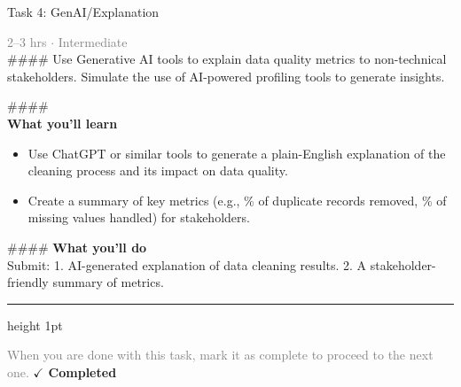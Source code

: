 \documentclass[10pt,a4paper]{article}
\begin{document}
\begin{taskbox}{Task 4: GenAI/Explanation}

    {\small \textcolor{gray}{2--3 hrs $\cdot$ Intermediate}}\\[12pt]

    \#\#\#\#   
Use Generative AI tools to explain data quality metrics to non-technical stakeholders. Simulate the use of AI-powered profiling tools to generate insights.

\#\#\#\# \\[10pt]
\vspace{8pt}
{\large \textbf{\textcolor{brandLight}{What you'll learn}}}\\[4pt]  
\begin{itemize}
    \item Use ChatGPT or similar tools to generate a plain-English explanation of the cleaning process and its impact on data quality.  
    \item Create a summary of key metrics (e.g., \% of duplicate records removed, \% of missing values handled) for stakeholders.  
\end{itemize}

\#\#\#\# \vspace{8pt}
{\large \textbf{\textcolor{brandLight}{What you'll do}}}\\[4pt]  
Submit:  
1. AI-generated explanation of data cleaning results.  
2. A stakeholder-friendly summary of metrics.\par

    \vspace{16pt}

    \textcolor{cardBorder}{\hrule height 1pt}\vspace{8pt}

    \small \textcolor{gray}{When you are done with this task, mark it as complete to proceed to the next one.} \hfill \textbf{\textcolor{brandDark}{$\checkmark$ Completed}}

\end{taskbox}
\end{document}
